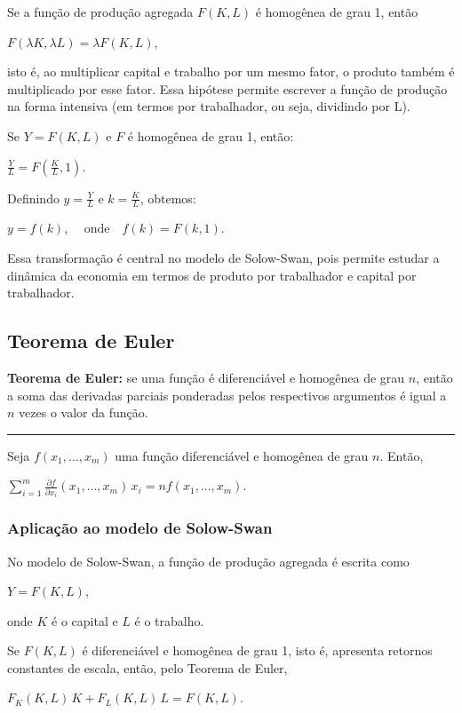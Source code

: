 \documentclass[12pt]{article}
\begin{document}
Se a função de produção agregada $F(K,L)$ é homogênea de grau 1, então

$F(\lambda K,\lambda L)=\lambda F(K,L)$,

isto é, ao multiplicar capital e trabalho por um mesmo fator, o produto também é multiplicado por esse fator.
Essa hipótese permite escrever a função de produção na forma intensiva (em termos por trabalhador, ou seja, dividindo por L). 

Se
$Y=F(K,L)$
e $F$ é homogênea de grau 1, então:

$\frac{Y}{L}=F\left(\frac{K}{L},1\right)$.

Definindo
$y=\frac{Y}{L}$ \quad e \quad $k=\frac{K}{L}$,
obtemos:

$y=f(k)$, $\quad \text{onde} \quad f(k)=F(k,1)$.

Essa transformação é central no modelo de Solow-Swan, pois permite estudar a dinâmica da economia em termos de produto por trabalhador e capital por trabalhador.
\newpage
\subsection{Teorema de Euler}

\textbf{Teorema de Euler:} se uma função é diferenciável e homogênea de grau $n$, então a soma das derivadas parciais ponderadas pelos respectivos argumentos é igual a $n$ vezes o valor da função.

\noindent\rule{\textwidth}{0.4pt}

Seja $f(x_1,\dots,x_m)$ uma função diferenciável e homogênea de grau $n$. Então,

$\sum_{i=1}^{m} \frac{\partial f}{\partial x_i}(x_1,\dots,x_m)\,x_i = n f(x_1,\dots,x_m)$.

\subsubsection{Aplicação ao modelo de Solow-Swan}

No modelo de Solow-Swan, a função de produção agregada é escrita como

$Y = F(K,L)$,

onde $K$ é o capital e $L$ é o trabalho.

Se $F(K,L)$ é diferenciável e homogênea de grau 1, isto é, apresenta retornos constantes de escala, então, pelo Teorema de Euler,

$F_K(K,L)\,K + F_L(K,L)\,L = F(K,L)$.
\end{document}
